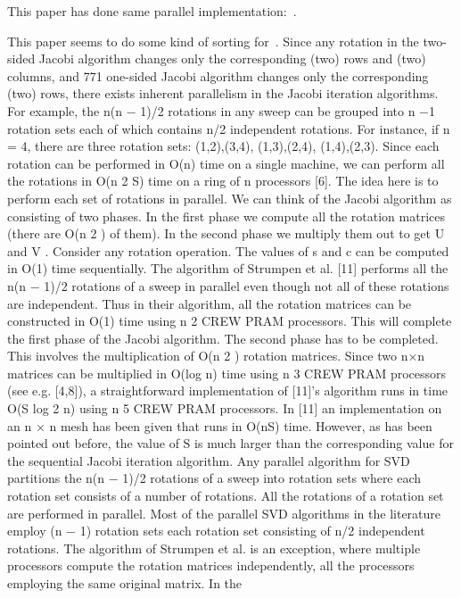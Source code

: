 \documentclass[10pt, conference, compsocconf]{IEEEtran}
\begin{document}
This paper has done same parallel implementation:~\cite{soliman2008memory}.

This paper seems to do some kind of sorting for~\cite{zhou1995parallel}.
Since any rotation in the two-sided Jacobi algorithm changes
only the corresponding (two) rows and (two) columns, and
771
one-sided Jacobi algorithm changes only the corresponding
(two) rows, there exists inherent parallelism in the Jacobi
iteration algorithms. For example, the n(n − 1)/2 rotations in
any sweep can be grouped into n −1 rotation sets each of which
contains n/2 independent rotations. For instance, if n = 4, there
are three rotation sets: {(1,2),(3,4)}, {(1,3),(2,4)}, {(1,4),(2,3)}.
Since each rotation can be performed in O(n) time on a single
machine, we can perform all the rotations in O(n 2 S) time on a
ring of n processors [6]. The idea here is to perform each set of
rotations in parallel.
We can think of the Jacobi algorithm as consisting of two
phases. In the first phase we compute all the rotation matrices
(there are O(n 2 ) of them). In the second phase we multiply
them out to get U and V . Consider any rotation operation. The
values of s and c can be computed in O(1) time sequentially.
The algorithm of Strumpen et al. [11] performs all the n(n −
1)/2 rotations of a sweep in parallel even though not all of
these rotations are independent. Thus in their algorithm, all
the rotation matrices can be constructed in O(1) time using
n 2 CREW PRAM processors. This will complete the first
phase of the Jacobi algorithm. The second phase has to be
completed. This involves the multiplication of O(n 2 ) rotation
matrices. Since two n×n matrices can be multiplied in O(log n)
time using n 3 CREW PRAM processors (see e.g. [4,8]), a
straightforward implementation of [11]’s algorithm runs in time
O(S log 2 n) using n 5 CREW PRAM processors. In [11] an
implementation on an n × n mesh has been given that runs
in O(nS) time. However, as has been pointed out before, the
value of S is much larger than the corresponding value for the
sequential Jacobi iteration algorithm.
Any parallel algorithm for SVD partitions the n(n − 1)/2
rotations of a sweep into rotation sets where each rotation
set consists of a number of rotations. All the rotations of a
rotation set are performed in parallel. Most of the parallel
SVD algorithms in the literature employ (n − 1) rotation sets
each rotation set consisting of n/2 independent rotations. The
algorithm of Strumpen et al. is an exception, where multiple
processors compute the rotation matrices independently, all
the processors employing the same original matrix. In the
\end{document}
